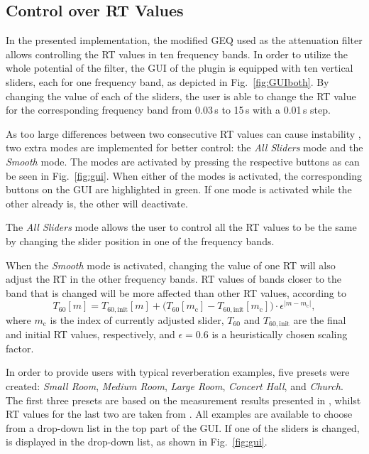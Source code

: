 \documentclass[twoside,a4paper]{article}
\begin{document}



\subsection{Control over RT Values}
In the presented implementation, the modified GEQ used as the attenuation filter allows controlling the RT values in ten frequency bands. In order to utilize the whole potential of the filter, the GUI of the plugin is equipped with ten vertical sliders, each for one frequency band, as depicted in Fig.~\ref{fig:GUIboth}. By changing the value of each of the sliders, the user is able to change the RT value for the corresponding frequency band from 0.03\,s to 15\,s with a 0.01\,s step. 

As too large differences between two consecutive RT values can cause instability \cite{prawda:2019:improved}, two extra modes are implemented for better control: the \textit{All Sliders} mode and the \textit{Smooth} mode. The modes are activated by pressing the respective buttons as can be seen in Fig.~\ref{fig:gui}. When either of the modes is activated, the corresponding buttons on the GUI are highlighted in green. If one mode is activated while the other already is, the other will deactivate.

The \textit{All Sliders} mode allows the user to control all the RT values to be the same by changing the slider position in one of the frequency bands. 

When the \textit{Smooth} mode is activated, changing the value of one RT will also adjust the RT in the other frequency bands. RT values of bands closer to the band that is changed will be more affected than other RT values, according to
\begin{equation}
T_{60}[m] = T_{60, \textrm{init}}[m] + \Big(T_{60}[m_\text{c}] - T_{60, \textrm{init}}[m_\text{c}]\Big) \cdot \epsilon^{|m-m_\text{c}|},
\label{eq:smooth}
\end{equation}
%
where $m_\text{c}$ is the index of currently adjusted slider, $T_{60}$ and $T_{60, \text{init}}$ are the final and initial RT values, respectively, and $\epsilon = 0.6$ is a heuristically chosen scaling factor.

In order to provide users with typical reverberation examples, five presets were created: \textit{Small Room}, \textit{Medium Room}, \textit{Large Room}, \textit{Concert Hall}, and \textit{Church}. The first three presets are based on the measurement results presented in \cite{jeub09}, whilst RT values for the last two are taken from \cite{air}. All examples are available to choose from a drop-down list in the top part of the GUI. If one of the sliders is changed,  is displayed in the drop-down list, as shown in Fig.~\ref{fig:gui}.
\end{document}
